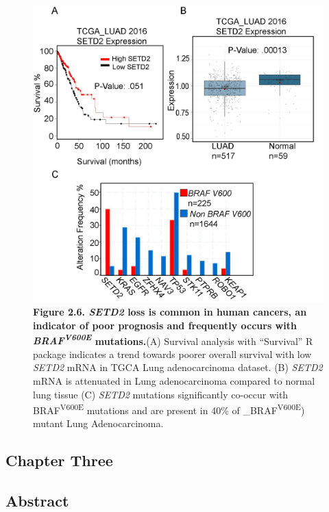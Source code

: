 \begin{figure}
\hypertarget{fig:09}{%
\centering
\includegraphics[width=1\textwidth,height=\textheight]{images/tuba6.png}
\caption{\textbf{Figure 2.6. \emph{SETD2} loss is common in human cancers, an indicator of poor prognosis and frequently occurs with \emph{BRAF\textsuperscript{V600E}} mutations.}(A) Survival analysis with ``Survival'' R package indicates a trend towards poorer overall survival with low \emph{SETD2} mRNA in TGCA Lung adenocarcinoma dataset. (B) \emph{SETD2} mRNA is attenuated in Lung adenocarcinoma compared to normal lung tissue (C) \emph{SETD2} mutations significantly co-occur with BRAF\textsuperscript{V600E} mutations and are present in 40\% of \_BRAF\textsuperscript{V600E}) mutant Lung Adenocarcinoma.}\label{fig:09}
}
\end{figure}

\hypertarget{chapter-three}{%
\subsection{Chapter Three}\label{chapter-three}}

\hypertarget{abstract}{%
\subsection{Abstract}\label{abstract}}

